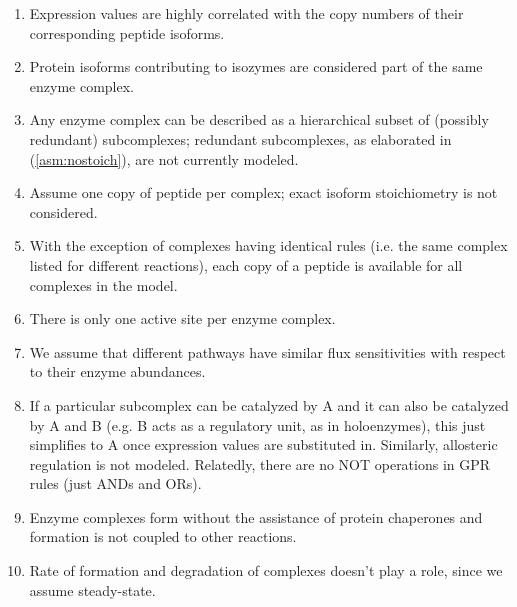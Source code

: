 

\begin{enumerate}
\item \label{asm:expcorr}
Expression values are highly correlated with the copy numbers of their
corresponding peptide isoforms.
\item \label{asm:isozyme} 
Protein isoforms contributing to isozymes are considered part of the
same enzyme complex.
\item \label{asm:hierarchy}
Any enzyme complex can be described as a hierarchical subset of
(possibly redundant) subcomplexes; redundant subcomplexes, as
elaborated in (\ref{asm:nostoich}), are not currently modeled.
\item \label{asm:nostoich} 
Assume one copy of peptide per complex; exact isoform stoichiometry
is not considered.
\item \label{asm:sharing} 
With the exception of complexes having identical rules (i.e. the same
complex listed for different reactions), each copy of a peptide
is available for all complexes in the model.
\item \label{asm:active_site}
There is only one active site per enzyme complex.
\item \label{asm:enzyme_sensitivity} 
We assume that different pathways have similar flux sensitivities
with respect to their enzyme abundances.
\item \label{asm:holo} 
If a particular subcomplex can be catalyzed by A and it can also be
catalyzed by A and B (e.g. B acts as a regulatory unit, as in
holoenzymes), this just simplifies to A once expression values are
substituted in. Similarly, allosteric regulation is not
modeled. Relatedly, there are no NOT operations in GPR rules (just ANDs
and ORs).
\item \label{asm:chap} 
Enzyme complexes form without the assistance of protein chaperones and
formation is not coupled to other reactions.  
\item \label{asm:rate} 
Rate of formation and degradation of complexes doesn't play a role,
since we assume steady-state. 
\end{enumerate}
